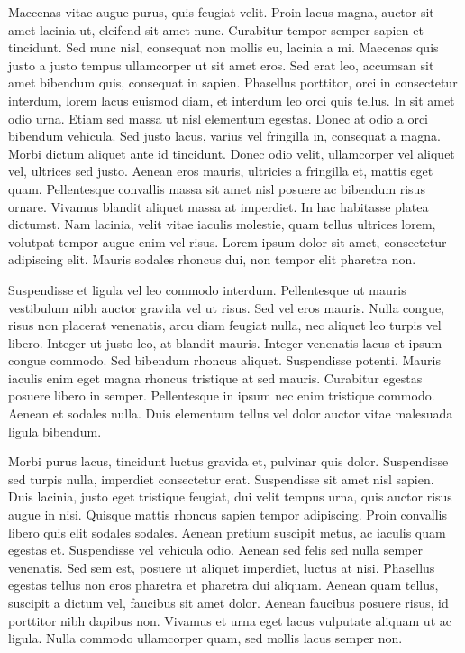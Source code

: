 Maecenas vitae augue purus, quis feugiat velit.
Proin lacus magna, auctor sit amet lacinia ut, eleifend sit amet nunc.
Curabitur tempor semper sapien et tincidunt.
Sed nunc nisl, consequat non mollis eu, lacinia a mi.
Maecenas quis justo a justo tempus ullamcorper ut sit amet eros.
Sed erat leo, accumsan sit amet bibendum quis, consequat in sapien.
Phasellus porttitor, orci in consectetur interdum, lorem lacus euismod diam, et interdum leo orci quis tellus.
In sit amet odio urna.
Etiam sed massa ut nisl elementum egestas.
Donec at odio a orci bibendum vehicula.
Sed justo lacus, varius vel fringilla in, consequat a magna.
Morbi dictum aliquet ante id tincidunt.
Donec odio velit, ullamcorper vel aliquet vel, ultrices sed justo.
Aenean eros mauris, ultricies a fringilla et, mattis eget quam.
Pellentesque convallis massa sit amet nisl posuere ac bibendum risus ornare.
Vivamus blandit aliquet massa at imperdiet.
In hac habitasse platea dictumst.
Nam lacinia, velit vitae iaculis molestie, quam tellus ultrices lorem, volutpat tempor augue enim vel risus.
Lorem ipsum dolor sit amet, consectetur adipiscing elit.
Mauris sodales rhoncus dui, non tempor elit pharetra non.

Suspendisse et ligula vel leo commodo interdum.
Pellentesque ut mauris vestibulum nibh auctor gravida vel ut risus.
Sed vel eros mauris.
Nulla congue, risus non placerat venenatis, arcu diam feugiat nulla, nec aliquet leo turpis vel libero.
Integer ut justo leo, at blandit mauris.
Integer venenatis lacus et ipsum congue commodo.
Sed bibendum rhoncus aliquet.
Suspendisse potenti.
Mauris iaculis enim eget magna rhoncus tristique at sed mauris.
Curabitur egestas posuere libero in semper.
Pellentesque in ipsum nec enim tristique commodo.
Aenean et sodales nulla.
Duis elementum tellus vel dolor auctor vitae malesuada ligula bibendum.

Morbi purus lacus, tincidunt luctus gravida et, pulvinar quis dolor.
Suspendisse sed turpis nulla, imperdiet consectetur erat.
Suspendisse sit amet nisl sapien.
Duis lacinia, justo eget tristique feugiat, dui velit tempus urna, quis auctor risus augue in nisi.
Quisque mattis rhoncus sapien tempor adipiscing.
Proin convallis libero quis elit sodales sodales.
Aenean pretium suscipit metus, ac iaculis quam egestas et.
Suspendisse vel vehicula odio.
Aenean sed felis sed nulla semper venenatis.
Sed sem est, posuere ut aliquet imperdiet, luctus at nisi.
Phasellus egestas tellus non eros pharetra et pharetra dui aliquam.
Aenean quam tellus, suscipit a dictum vel, faucibus sit amet dolor.
Aenean faucibus posuere risus, id porttitor nibh dapibus non.
Vivamus et urna eget lacus vulputate aliquam ut ac ligula.
Nulla commodo ullamcorper quam, sed mollis lacus semper non.

